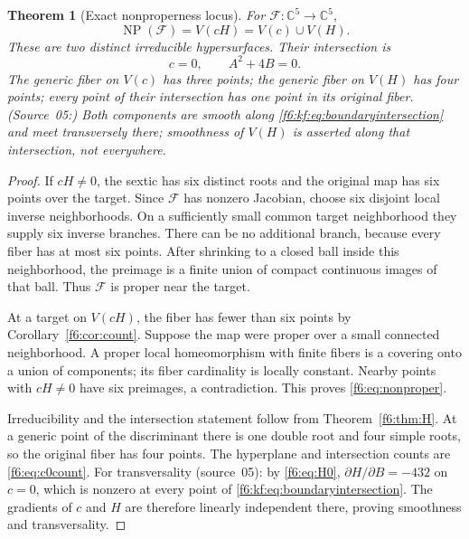 \documentclass[11pt,a4paper]{article}
\newtheorem{theorem}{Theorem}[section]
\theoremstyle{definition}
\newcommand{\C}{\mathbb C}
\newcommand{\F}{\mathcal F}
\newcommand{\NP}{\operatorname{NP}}
\newcommand{\src}[1]{\textup{(source~#1)}}
\begin{document}
\begin{theorem}[Exact nonproperness locus]\label{f6:thm:nonproper}
For $\F:\C^5\to\C^5$,
\begin{equation}\label{f6:eq:nonproper}
 \NP(\F)=V(cH)=V(c)\cup V(H).
\end{equation}
These are two distinct irreducible hypersurfaces. Their intersection is
\begin{equation}\label{f6:kf:eq:boundaryintersection}
 c=0,\qquad A^2+4B=0.
\end{equation}
The generic fiber on $V(c)$ has three points; the generic fiber on
$V(H)$ has four points; every point of their intersection has one point
in its original fiber. \textup{(Source~05:)} Both components are smooth
along \eqref{f6:kf:eq:boundaryintersection} and meet transversely there;
smoothness of $V(H)$ is asserted along that intersection, not everywhere.
\end{theorem}
\begin{proof}
If $cH\ne0$, the sextic has six distinct roots and the original map has
six points over the target. Since $\F$ has nonzero Jacobian, choose six
disjoint local inverse neighborhoods. On a sufficiently small common
target neighborhood they supply six inverse branches. There can be no
additional branch, because every fiber has at most six points. After
shrinking to a closed ball inside this neighborhood, the preimage is
a finite union of compact continuous images of that ball. Thus $\F$ is
proper near the target.

At a target on $V(cH)$, the fiber has fewer than six points by
Corollary~\ref{f6:cor:count}. Suppose the map were proper over a small
connected neighborhood. A proper local homeomorphism with finite fibers
is a covering onto a union of components; its fiber cardinality is
locally constant. Nearby points with $cH\ne0$ have six preimages, a
contradiction. This proves \eqref{f6:eq:nonproper}.

Irreducibility and the intersection statement follow from
Theorem~\ref{f6:thm:H}. At a generic point of the discriminant there is one
double root and four simple roots, so the original fiber has four
points. The hyperplane and intersection counts are
\eqref{f6:eq:c0count}. For transversality \src{05}: by \eqref{f6:eq:H0},
$\partial H/\partial B=-432$ on $c=0$, which is nonzero at every point of
\eqref{f6:kf:eq:boundaryintersection}. The gradients of $c$ and $H$ are
therefore linearly independent there, proving smoothness and
transversality.
\end{proof}
\end{document}
